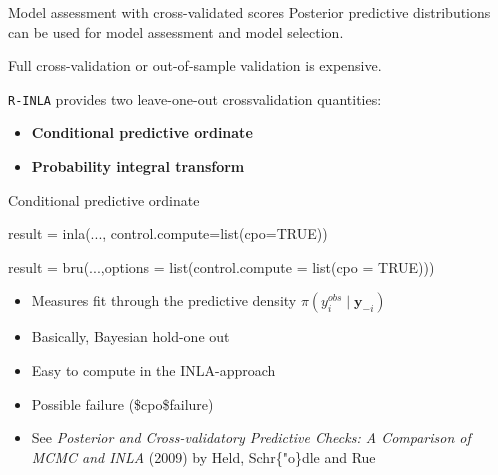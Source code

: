 \documentclass[
  ignorenonframetext,
  handout]{beamer}
\newenvironment{Shaded}{\begin{snugshade}}{\end{snugshade}}
\newcommand{\AttributeTok}[1]{\textcolor[rgb]{0.77,0.63,0.00}{#1}}
\newcommand{\ConstantTok}[1]{\textcolor[rgb]{0.00,0.00,0.00}{#1}}
\newcommand{\FunctionTok}[1]{\textcolor[rgb]{0.00,0.00,0.00}{#1}}
\newcommand{\NormalTok}[1]{#1}
\newcommand{\OtherTok}[1]{\textcolor[rgb]{0.56,0.35,0.01}{#1}}
\begin{document}
\begin{frame}[fragile]{Model assessment with cross-validated scores}
\protect\hypertarget{model-assessment-with-cross-validated-scores}{}
Posterior predictive distributions can be used for model assessment and
model selection.

Full cross-validation or out-of-sample validation is expensive.

\texttt{R-INLA} provides two leave-one-out crossvalidation quantities:

\begin{itemize}
\item
  \textbf{Conditional predictive ordinate}
\item
  \textbf{Probability integral transform}
\end{itemize}
\end{frame}

\begin{frame}[fragile]{Conditional predictive ordinate}
\protect\hypertarget{conditional-predictive-ordinate}{}
\small

\begin{Shaded}
\begin{Highlighting}[]
\NormalTok{result }\OtherTok{=} \FunctionTok{inla}\NormalTok{(...,}
              \AttributeTok{control.compute=}\FunctionTok{list}\NormalTok{(}\AttributeTok{cpo=}\ConstantTok{TRUE}\NormalTok{))}

\NormalTok{result }\OtherTok{=} \FunctionTok{bru}\NormalTok{(...,}\AttributeTok{options =} \FunctionTok{list}\NormalTok{(}\AttributeTok{control.compute =} 
                                  \FunctionTok{list}\NormalTok{(}\AttributeTok{cpo =} \ConstantTok{TRUE}\NormalTok{)))}
\end{Highlighting}
\end{Shaded}

\normalsize

\begin{itemize}
\item
  Measures fit through the predictive density
  \(\pi(y_i^{obs}\mid\boldsymbol{y}_{-i})\)
\item
  Basically, Bayesian hold-one out
\item
  Easy to compute in the INLA-approach
\item
  Possible failure (\$cpo\$failure)
\item
  See \emph{Posterior and Cross-validatory Predictive Checks: A
  Comparison of MCMC and INLA} (2009) by Held, Schr\{"o\}dle and Rue
\end{itemize}
\end{frame}
\end{document}
